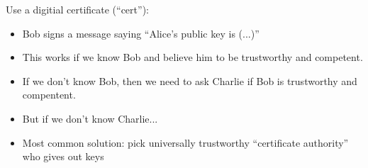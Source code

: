 \begin{itemize}
        Use a digitial certificate (``cert''):
        \begin{itemize}
            \item Bob signs a message saying ``Alice's public key is (...)''
            \item This works if we know Bob and believe him to be trustworthy
                and competent.
            \item If we don't know Bob, then we need to ask Charlie if Bob is
                trustworthy and compentent.
            \item But if we don't know Charlie...
            \item Most common solution: pick universally trustworthy
                ``certificate authority'' who gives out keys
        \end{itemize}
\end{itemize}
